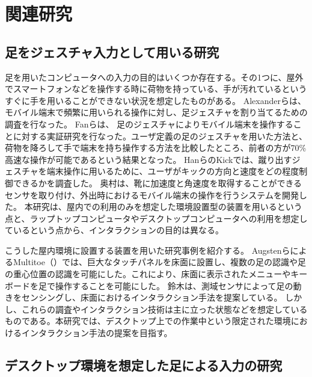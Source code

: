 \chapter{関連研究}

\section{足をジェスチャ入力として用いる研究}
足を用いたコンピュータへの入力の目的はいくつか存在する。その1つに、屋外でスマートフォンなどを操作する時に荷物を持っている、手が汚れているというすぐに手を用いることができない状況を想定したものがある。
Alexanderら\cite{Alexander:2012:PYB:2207676.2208575}は、モバイル端末で頻繁に用いられる操作に対し、足ジェスチャを割り当てるための調査を行なった。	
Fanら\cite{Fan:2017:ESF:3123021.3123043}は、
足のジェスチャによりモバイル端末を操作することに対する実証研究を行なった。ユーザ定義の足のジェスチャを用いた方法と、荷物を降ろして手で端末を持ち操作する方法を比較したところ、前者の方が70\%高速な操作が可能であるという結果となった。
HanらのKick\cite{Han:2011:KIU:2037373.2037379}では、蹴り出すジェスチャを端末操作に用いるために、ユーザがキックの方向と速度をどの程度制御できるかを調査した。
奥村\cite{okumura_2011}は、靴に加速度と角速度を取得することができるセンサを取り付け、外出時におけるモバイル端末の操作を行うシステムを開発した。
本研究は、屋内での利用のみを想定した環境設置型の装置を用いるという点と、ラップトップコンピュータやデスクトップコンピュータへの利用を想定しているという点から、インタラクションの目的は異なる。

こうした屋内環境に設置する装置を用いた研究事例を紹介する。
AugstenらによるMultitoe\cite{Augsten:2010:MHI:1866029.1866064}（）では、巨大なタッチパネルを床面に設置し、複数の足の認識や足の重心位置の認識を可能にした。これにより、床面に表示されたメニューやキーボードを足で操作することを可能にした。
鈴木\cite{ssuzuki_2009}は、測域センサによって足の動きをセンシングし、床面におけるインタラクション手法を提案している。
しかし、これらの調査やインタラクション技術は主に立った状態などを想定しているものである。本研究では、デスクトップ上での作業中という限定された環境におけるインタラクション手法の提案を目指す。

\section{デスクトップ環境を想定した足による入力の研究}

